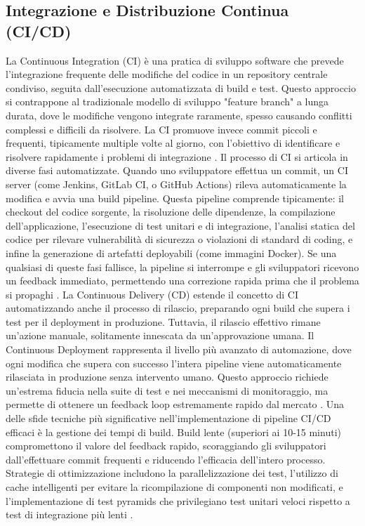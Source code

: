 \documentclass[12pt,a4paper,openright,twoside]{book}
\begin{document}
\subsection{Integrazione e Distribuzione Continua (CI/CD)}
La Continuous Integration (CI) è una pratica di sviluppo software che prevede l'integrazione frequente delle modifiche del codice in un repository centrale condiviso, seguita dall'esecuzione automatizzata di build e test. Questo approccio si contrappone al tradizionale modello di sviluppo "feature branch" a lunga durata, dove le modifiche vengono integrate raramente, spesso causando conflitti complessi e difficili da risolvere. La CI promuove invece commit piccoli e frequenti, tipicamente multiple volte al giorno, con l'obiettivo di identificare e risolvere rapidamente i problemi di integrazione \cite{Rahman_2018}.
Il processo di CI si articola in diverse fasi automatizzate. Quando uno sviluppatore effettua un commit, un CI server (come Jenkins, GitLab CI, o GitHub Actions) rileva automaticamente la modifica e avvia una build pipeline. Questa pipeline comprende tipicamente: il checkout del codice sorgente, la risoluzione delle dipendenze, la compilazione dell'applicazione, l'esecuzione di test unitari e di integrazione, l'analisi statica del codice per rilevare vulnerabilità di sicurezza o violazioni di standard di coding, e infine la generazione di artefatti deployabili (come immagini Docker). Se una qualsiasi di queste fasi fallisce, la pipeline si interrompe e gli sviluppatori ricevono un feedback immediato, permettendo una correzione rapida prima che il problema si propaghi \cite{ghaleb2019empirical}.
La Continuous Delivery (CD) estende il concetto di CI automatizzando anche il processo di rilascio, preparando ogni build che supera i test per il deployment in produzione. Tuttavia, il rilascio effettivo rimane un'azione manuale, solitamente innescata da un'approvazione umana. Il Continuous Deployment rappresenta il livello più avanzato di automazione, dove ogni modifica che supera con successo l'intera pipeline viene automaticamente rilasciata in produzione senza intervento umano. Questo approccio richiede un'estrema fiducia nella suite di test e nei meccanismi di monitoraggio, ma permette di ottenere un feedback loop estremamente rapido dal mercato \cite{teixeira2020systematic}.
Una delle sfide tecniche più significative nell'implementazione di pipeline CI/CD efficaci è la gestione dei tempi di build. Build lente (superiori ai 10-15 minuti) compromettono il valore del feedback rapido, scoraggiando gli sviluppatori dall'effettuare commit frequenti e riducendo l'efficacia dell'intero processo. Strategie di ottimizzazione includono la parallelizzazione dei test, l'utilizzo di cache intelligenti per evitare la ricompilazione di componenti non modificati, e l'implementazione di test pyramids che privilegiano test unitari veloci rispetto a test di integrazione più lenti \cite{ghaleb2019empirical}.
\end{document}
